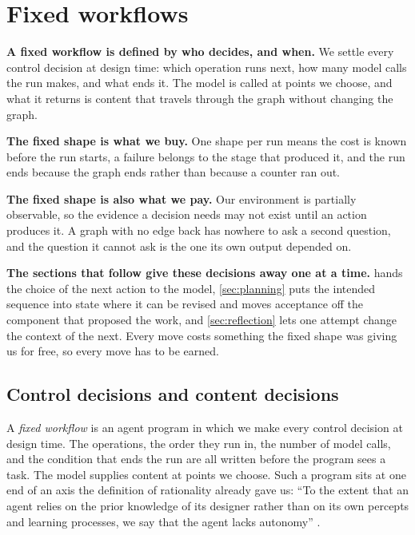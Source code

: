 \section{Fixed workflows}
\label{sec:fixed}

\begin{upshot}
\item \textbf{A fixed workflow is defined by who decides, and when.} We settle every control
  decision at design time: which operation runs next, how many model calls the run makes, and
  what ends it. The model is called at points we choose, and what it returns is content that
  travels through the graph without changing the graph.
\item \textbf{The fixed shape is what we buy.} One shape per run means the cost is known before
  the run starts, a failure belongs to the stage that produced it, and the run ends because the
  graph ends rather than because a counter ran out.
\item \textbf{The fixed shape is also what we pay.} Our environment is partially observable, so
  the evidence a decision needs may not exist until an action produces it. A graph with no edge
  back has nowhere to ask a second question, and the question it cannot ask is the one its own
  output depended on.
\item \textbf{The sections that follow give these decisions away one at a time.} 
  hands the choice of the next action to the model, \cref{sec:planning} puts the intended sequence
  into state where it can be revised and moves acceptance off the component that proposed the work,
  and \cref{sec:reflection} lets one attempt change the context of the next. Every move costs
  something the fixed shape was giving us for free, so every move has to be earned.
\end{upshot}

\subsection{Control decisions and content decisions}
\label{sec:fixed-decisions}

\begin{definition}
\label{def:fixed-workflow}
A \emph{fixed workflow} is an agent program in which we make every control decision at design time. The operations, the order they run in, the number of model calls, and the condition that ends the run are all written before the program sees a task. The model supplies content at points we choose. Such a program sits at one end of an axis the definition of rationality already gave us: ``To the extent that an agent relies on the prior knowledge of its designer rather than on its own percepts and learning processes, we say that the agent lacks autonomy'' \citep[\S2.2.3]{russell2020aima}.
\end{definition}

